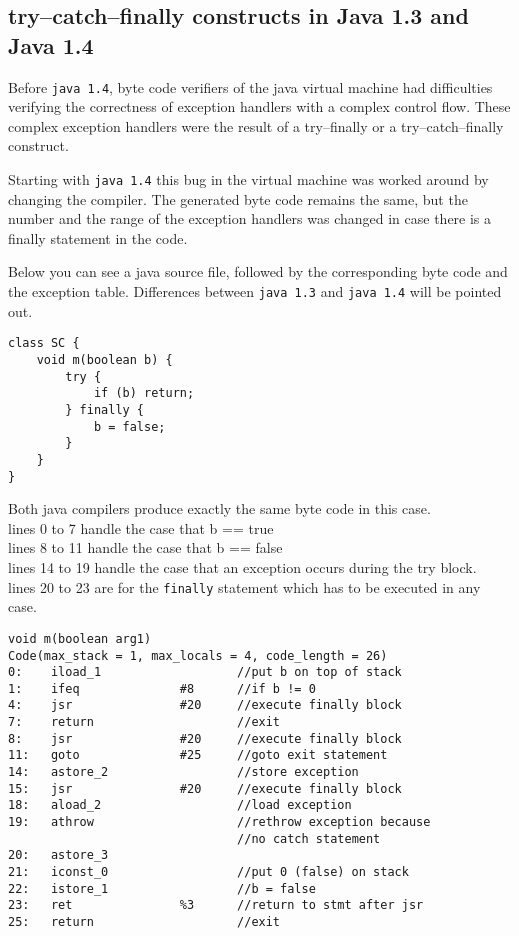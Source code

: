\documentclass[11pt,twoside,a4paper,draft]{article}
\begin{document}
\subsection {try--catch--finally constructs in Java 1.3 and Java 1.4}

Before \texttt{java 1.4}, byte code verifiers of the java virtual machine had
difficulties verifying the correctness of exception handlers with a complex
control flow. These complex exception handlers were the result of a 
try--finally or a try--catch--finally construct.

Starting with \texttt{java 1.4} this bug in the virtual machine was worked around by
changing the compiler. The generated byte code remains the same, but the number
and the range of the exception handlers was changed in case there is a
finally statement in the code. 

Below you can see a java source file, followed by the corresponding byte code
and the exception table. Differences between \texttt{java 1.3} and \texttt{java 1.4} will be pointed out.

\begin{verbatim}
class SC {
    void m(boolean b) {
        try {
            if (b) return;
        } finally {
            b = false;
        }
    }
}
\end{verbatim}
Both java compilers produce exactly the same byte code in this case.
\\lines 0 to 7 handle the case that b == true
\\lines 8 to 11 handle the case that b == false
\\lines 14 to 19 handle the case that an exception occurs during the
try block.
\\lines 20 to 23 are for the \texttt{finally} statement which has to be 
executed in any case.

\begin{verbatim}
void m(boolean arg1)
Code(max_stack = 1, max_locals = 4, code_length = 26)
0:    iload_1                   //put b on top of stack
1:    ifeq              #8      //if b != 0
4:    jsr               #20     //execute finally block
7:    return                    //exit
8:    jsr               #20     //execute finally block
11:   goto              #25     //goto exit statement
14:   astore_2                  //store exception
15:   jsr               #20     //execute finally block
18:   aload_2                   //load exception
19:   athrow                    //rethrow exception because 
                                //no catch statement
20:   astore_3			
21:   iconst_0                  //put 0 (false) on stack
22:   istore_1                  //b = false
23:   ret               %3      //return to stmt after jsr
25:   return                    //exit

\end{verbatim}
\end{document}
